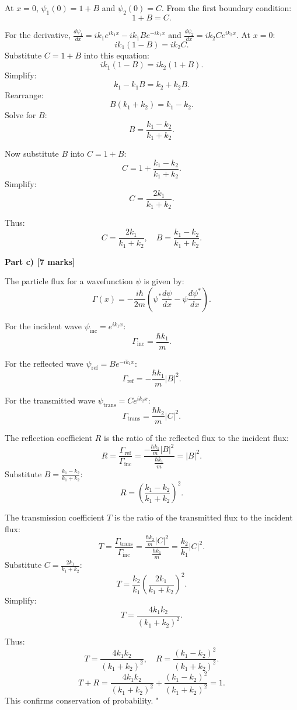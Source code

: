 At $x = 0$, $\psi_1(0) = 1 + B$ and $\psi_2(0) = C$. From the first boundary condition:
\[
1 + B = C.
\]

For the derivative, $\frac{d\psi_1}{dx} = ik_1 e^{ik_1x} - ik_1 Be^{-ik_1x}$ and $\frac{d\psi_2}{dx} = ik_2 Ce^{ik_2x}$. At $x = 0$:
\[
ik_1 (1 - B) = ik_2 C.
\]
Substitute $C = 1 + B$ into this equation:
\[
ik_1 (1 - B) = ik_2 (1 + B).
\]
Simplify:
\[
k_1 - k_1B = k_2 + k_2B.
\]
Rearrange:
\[
B(k_1 + k_2) = k_1 - k_2.
\]
Solve for $B$:
\[
B = \frac{k_1 - k_2}{k_1 + k_2}.
\]

Now substitute $B$ into $C = 1 + B$:
\[
C = 1 + \frac{k_1 - k_2}{k_1 + k_2}.
\]
Simplify:
\[
C = \frac{2k_1}{k_1 + k_2}.
\]

Thus:
\[
C = \frac{2k_1}{k_1 + k_2}, \quad B = \frac{k_1 - k_2}{k_1 + k_2}.
\]

\textbf{Part c) [7 marks]} 

The particle flux for a wavefunction $\psi$ is given by:
\[
\Gamma(x) = -\frac{i\hbar}{2m} \left( \psi^* \frac{d\psi}{dx} - \psi \frac{d\psi^*}{dx} \right).
\]

For the incident wave $\psi_\text{inc} = e^{ik_1x}$:
\[
\Gamma_\text{inc} = \frac{\hbar k_1}{m}.
\]

For the reflected wave $\psi_\text{ref} = Be^{-ik_1x}$:
\[
\Gamma_\text{ref} = -\frac{\hbar k_1}{m} |B|^2.
\]

For the transmitted wave $\psi_\text{trans} = Ce^{ik_2x}$:
\[
\Gamma_\text{trans} = \frac{\hbar k_2}{m} |C|^2.
\]

The reflection coefficient $R$ is the ratio of the reflected flux to the incident flux:
\[
R = \frac{\Gamma_\text{ref}}{\Gamma_\text{inc}} = \frac{-\frac{\hbar k_1}{m} |B|^2}{\frac{\hbar k_1}{m}} = |B|^2.
\]
Substitute $B = \frac{k_1 - k_2}{k_1 + k_2}$:
\[
R = \left( \frac{k_1 - k_2}{k_1 + k_2} \right)^2.
\]

The transmission coefficient $T$ is the ratio of the transmitted flux to the incident flux:
\[
T = \frac{\Gamma_\text{trans}}{\Gamma_\text{inc}} = \frac{\frac{\hbar k_2}{m} |C|^2}{\frac{\hbar k_1}{m}} = \frac{k_2}{k_1} |C|^2.
\]
Substitute $C = \frac{2k_1}{k_1 + k_2}$:
\[
T = \frac{k_2}{k_1} \left( \frac{2k_1}{k_1 + k_2} \right)^2.
\]
Simplify:
\[
T = \frac{4k_1k_2}{(k_1 + k_2)^2}.
\]

Thus:
\[
T = \frac{4k_1k_2}{(k_1 + k_2)^2}, \quad R = \frac{(k_1 - k_2)^2}{(k_1 + k_2)^2}.
\]
\[
T + R = \frac{4k_1k_2}{(k_1 + k_2)^2} + \frac{(k_1 - k_2)^2}{(k_1 + k_2)^2} = 1.
\]
This confirms conservation of probability.
"

